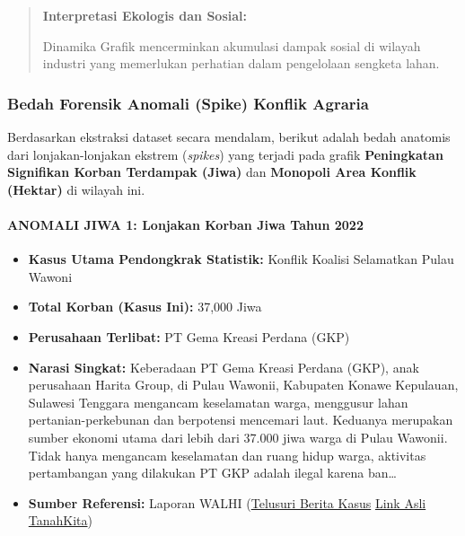 \documentclass[
]{article}
\providecommand{\tightlist}{%
  \setlength{\itemsep}{0pt}\setlength{\parskip}{0pt}}
\begin{document}
\begin{quote}
\textbf{Interpretasi Ekologis dan Sosial:}

Dinamika Grafik mencerminkan akumulasi dampak sosial di wilayah industri
yang memerlukan perhatian dalam pengelolaan sengketa lahan.
\end{quote}

\subsubsection{Bedah Forensik Anomali (Spike) Konflik
Agraria}\label{bedah-forensik-anomali-spike-konflik-agraria}

Berdasarkan ekstraksi dataset secara mendalam, berikut adalah bedah
anatomis dari lonjakan-lonjakan ekstrem (\emph{spikes}) yang terjadi
pada grafik \textbf{Peningkatan Signifikan Korban Terdampak (Jiwa)} dan
\textbf{Monopoli Area Konflik (Hektar)} di wilayah ini.

\paragraph{ANOMALI JIWA 1: Lonjakan Korban Jiwa Tahun
2022}\label{anomali-jiwa-1-lonjakan-korban-jiwa-tahun-2022}

\begin{itemize}
\tightlist
\item
  \textbf{Kasus Utama Pendongkrak Statistik:} Konflik Koalisi Selamatkan
  Pulau Wawoni
\item
  \textbf{Total Korban (Kasus Ini):} 37,000 Jiwa
\item
  \textbf{Perusahaan Terlibat:} PT Gema Kreasi Perdana (GKP)
\item
  \textbf{Narasi Singkat:} Keberadaan PT Gema Kreasi Perdana (GKP), anak
  perusahaan Harita Group, di Pulau Wawonii, Kabupaten Konawe Kepulauan,
  Sulawesi Tenggara mengancam keselamatan warga, menggusur lahan
  pertanian-perkebunan dan berpotensi mencemari laut. Keduanya merupakan
  sumber ekonomi utama dari lebih dari 37.000 jiwa warga di Pulau
  Wawonii. Tidak hanya mengancam keselamatan dan ruang hidup warga,
  aktivitas pertambangan yang dilakukan PT GKP adalah ilegal karena
  ban\ldots{}
\item
  \textbf{Sumber Referensi:} Laporan WALHI
  (\href{https://www.google.com/search?q=Konflik\%20Koalisi\%20Selamatkan\%20Pulau\%20Wawoni\%20PT\%20Gema\%20Kreasi\%20Perdana\%20\%28GKP\%29}{Telusuri
  Berita Kasus} \textbar{}
  \href{https://tanahkita.id/data/konflik/detil/SWpxcGxoUThtUVk}{Link
  Asli TanahKita})
\end{itemize}
\end{document}
